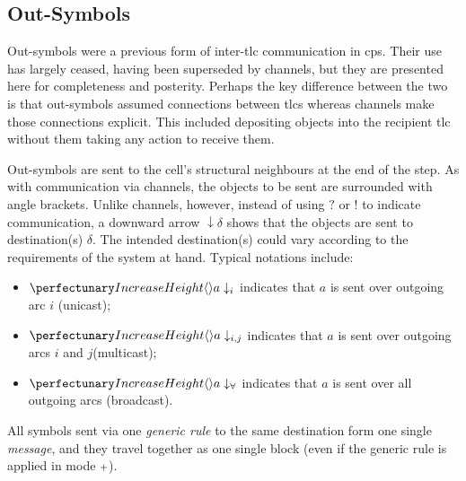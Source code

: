 \subsection{\label{sec:cps:outsymbols}Out-Symbols}
Out-symbols were a previous form of inter-\gls{tlc} communication in \gls{cps}.  Their use has largely ceased, having been superseded by channels, but they are presented here for completeness and posterity.  Perhaps the key difference between the two is that out-symbols assumed connections between \glspl{tlc} whereas channels make those connections explicit.  This included depositing objects into the recipient \gls{tlc} without them taking any action to receive them.

Out-symbols  are sent to the cell's structural neighbours at the end of the step.
As with communication via channels, the objects to be sent are surrounded with angle brackets.  Unlike channels, however, instead of using \(?\) or \(!\) to indicate communication, a downward arrow \(\downarrow\delta\) shows that the objects are sent to destination(s) \(\delta\).  The intended destination(s) could vary according to the requirements of the system at hand.
Typical notations include: 

\begin{itemize}
\item \(\cpoutsymbol{a}{i}\) indicates that \(a\) is sent over outgoing arc \(i\) (unicast); 

\item \(\cpoutsymbol{a}{i,j}\) indicates that \(a\) is sent over outgoing arcs \(i\) and \(j\)(multicast); 

\item \(\cpoutsymbolall{a}\) indicates that \(a\) is sent over all outgoing arcs (broadcast). 
\end{itemize}

All symbols sent via one \emph{generic rule} to the same destination form one single \emph{message}, and they travel together as one single block (even if the generic rule is applied in mode \({\scriptstyle +}\)).



